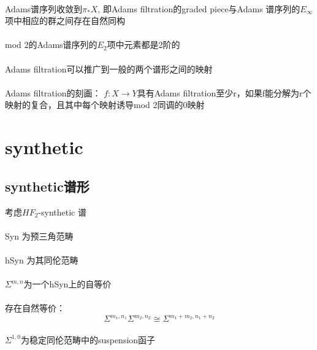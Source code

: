 \documentclass[12pt,a4paper]{article}
\begin{document}
\begin{sloppy}
\paragraph{}
Adams谱序列收敛到$\pi_*X$, 即Adams filtration的graded piece与Adams 谱序列的$E_\infty$项中相应的群之间存在自然同构

\paragraph{}mod 2的Adams谱序列的$E_2$项中元素都是2阶的 

\paragraph{}Adams filtration可以推广到一般的两个谱形之间的映射

\paragraph{}Adams filtration的刻画：
$f:X\xrightarrow{}Y$具有Adams filtration至少r，如果f能分解为r个映射的复合，且其中每个映射诱导mod 2同调的0映射

\section{synthetic}
\subsection{synthetic谱形}
考虑$HF_2$-synthetic 谱
\paragraph{}Syn 为预三角范畴

\paragraph{} hSyn
为其同伦范畴

\paragraph{}$\Sigma^{m,n}$为一个hSyn上的自等价

\paragraph{}存在自然等价：
$$\Sigma^{m_1,n_1}\Sigma^{m_2,n_2}\cong\Sigma^{m_1+m_2,n_1+n_2}$$


\paragraph{}$\Sigma^{1,0}$为稳定同伦范畴中的suspension函子



\end{sloppy}
\end{document}
